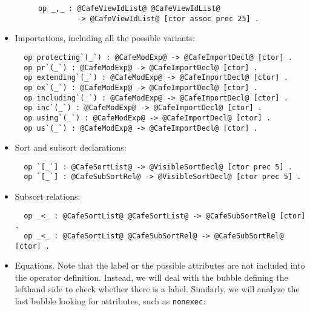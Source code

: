 \begin{itemize}
\begin{itemize}
{\codesize
\begin{verbatim}
  op _,_ : @CafeViewIdList@ @CafeViewIdList@
           -> @CafeViewIdList@ [ctor assoc prec 25] .
\end{verbatim}
}

\end{itemize}

\item
Importations, including all the possible variants:

{\codesize
\begin{verbatim}
  op protecting`(_`) : @CafeModExp@ -> @CafeImportDecl@ [ctor] .
  op pr`(_`) : @CafeModExp@ -> @CafeImportDecl@ [ctor] .
  op extending`(_`) : @CafeModExp@ -> @CafeImportDecl@ [ctor] .
  op ex`(_`) : @CafeModExp@ -> @CafeImportDecl@ [ctor] .
  op including`(_`) : @CafeModExp@ -> @CafeImportDecl@ [ctor] .
  op inc`(_`) : @CafeModExp@ -> @CafeImportDecl@ [ctor] .
  op using`(_`) : @CafeModExp@ -> @CafeImportDecl@ [ctor] .
  op us`(_`) : @CafeModExp@ -> @CafeImportDecl@ [ctor] .
\end{verbatim}
}

\item
Sort and subsort declarations:

{\codesize
\begin{verbatim}
  op `[_`] : @CafeSortList@ -> @VisibleSortDecl@ [ctor prec 5] .
  op `[_`] : @CafeSubSortRel@ -> @VisibleSortDecl@ [ctor prec 5] .
\end{verbatim}
}

\item
Subsort relations:

{\codesize
\begin{verbatim}
  op _<_ : @CafeSortList@ @CafeSortList@ -> @CafeSubSortRel@ [ctor] .
  op _<_ : @CafeSortList@ @CafeSubSortRel@ -> @CafeSubSortRel@ [ctor] .
\end{verbatim}
}

{\codesize
\begin{comment}
  op var_:_. : @NeCafeTokenList@ @CafeType@ -> @CafeVarDecl@ [ctor] .
  op vars_:_. : @NeCafeTokenList@ @CafeType@ -> @CafeVarDecl@ [ctor] .
\end{comment}
}

\item
Equations. Note that the label or the possible attributes are not included
into the operator definition. Instead, we will deal with the bubble defining
the lefthand side to check whether there is a label. Similarly, we will
analyze the last bubble looking for attributes, such as \verb"nonexec":


\end{itemize}
